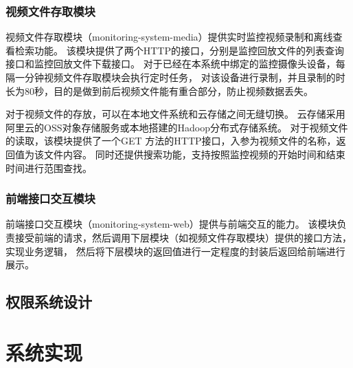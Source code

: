 \subsection{视频文件存取模块}
视频文件存取模块（monitoring-system-media）提供实时监控视频录制和离线查看检索功能。
该模块提供了两个HTTP的接口，分别是监控回放文件的列表查询接口和监控回放文件下载接口。
对于已经在本系统中绑定的监控摄像头设备，每隔一分钟视频文件存取模块会执行定时任务，
对该设备进行录制，并且录制的时长为80秒，目的是做到前后视频文件能有重合部分，防止视频数据丢失。

对于视频文件的存放，可以在本地文件系统和云存储之间无缝切换。
云存储采用阿里云的OSS对象存储服务或本地搭建的Hadoop分布式存储系统。
对于视频文件的读取，该模块提供了一个GET 方法的HTTP接口，入参为视频文件的名称，返回值为该文件内容。
同时还提供搜索功能，支持按照监控视频的开始时间和结束时间进行范围查找。


\subsection{前端接口交互模块}
前端接口交互模块（monitoring-system-web）提供与前端交互的能力。
该模块负责接受前端的请求，然后调用下层模块（如视频文件存取模块）提供的接口方法，实现业务逻辑，
然后将下层模块的返回值进行一定程度的封装后返回给前端进行展示。





\section{权限系统设计}



























\chapter{系统实现}
